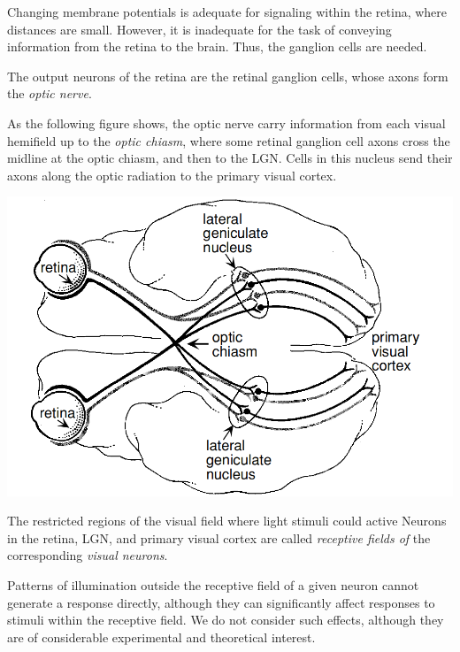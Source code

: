 \begin{rem}
   Changing membrane potentials is adequate for signaling within the retina, where distances are small. However, it is inadequate for the task of conveying information from the retina to the brain. Thus, the ganglion cells are needed.
\end{rem}

\begin{defn}
  \label{defn:opticNerve}
  The output neurons of the retina are the retinal ganglion cells, whose axons form the \emph{optic nerve}.
\end{defn}

\begin{prin}
  \label{prin:visualPathway}
  As the following figure shows, the optic nerve carry information from each visual hemifield up to the \emph{optic chiasm}, where some retinal ganglion cell axons cross the midline at the optic chiasm, and then to the LGN. Cells in this nucleus send their axons along the optic radiation to the primary visual cortex.
  \begin{center}
    \includegraphics[scale=0.2]{./png/visualPathway}
  \end{center}
\end{prin}

\begin{defn}
  \label{def:visualReceptiveField}
  The restricted regions of the visual field where light stimuli could active Neurons in the retina, LGN, and primary visual cortex are called \emph{receptive fields of} the corresponding \emph{visual neurons}.
\end{defn}

\begin{asm}
  \label{asm:OutsideRecept}
  Patterns of illumination outside the receptive field of a given neuron cannot generate a response directly, although they can significantly affect responses to stimuli within the receptive field. We do not consider such effects, although they are of considerable experimental and theoretical interest.
\end{asm}

